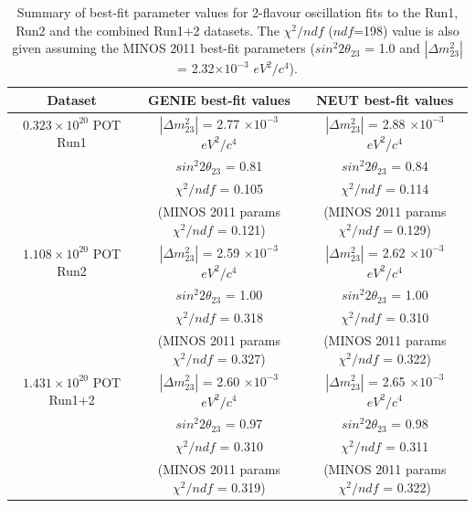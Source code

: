 \begin{table}[htb]
\center
\renewcommand{\arraystretch}{1.75} %
\begin{tabular}{|c||c|c|}
\hline
Dataset                             &  GENIE best-fit values                                         &  NEUT best-fit values   \\
\hline
$0.323\times10^{20}$ POT Run1       &   $|\Delta m^{2}_{23}|$ = 2.77 $\times10^{-3}$ $eV^{2}/c^{4}$  &  $|\Delta m^{2}_{23}|$ = 2.88 $\times10^{-3}$ $eV^{2}/c^{4}$     \\
                                    &   $sin^{2}2\theta_{23}$ = 0.81                                 &  $sin^{2}2\theta_{23}$ = 0.84 \\
                                    &   $\chi^{2}/ndf$ = 0.105                                       &  $\chi^{2}/ndf$ = 0.114 \\
                                    &   (MINOS 2011 params $\chi^{2}/ndf$ = 0.121)                   &  (MINOS 2011 params $\chi^{2}/ndf$ = 0.129) \\
\hline
$1.108\times10^{20}$ POT Run2       &   $|\Delta m^{2}_{23}|$ = 2.59 $\times10^{-3}$ $eV^{2}/c^{4}$  &  $|\Delta m^{2}_{23}|$ = 2.62 $\times10^{-3}$ $eV^{2}/c^{4}$     \\
                                    &   $sin^{2}2\theta_{23}$ = 1.00                                 &  $sin^{2}2\theta_{23}$ = 1.00 \\
                                    &   $\chi^{2}/ndf$ = 0.318                                       &  $\chi^{2}/ndf$ = 0.310 \\
                                    &   (MINOS 2011 params $\chi^{2}/ndf$ = 0.327)                   &  (MINOS 2011 params $\chi^{2}/ndf$ = 0.322) \\
\hline
$1.431\times10^{20}$ POT Run1+2     &   $|\Delta m^{2}_{23}|$ = 2.60 $\times10^{-3}$ $eV^{2}/c^{4}$  &  $|\Delta m^{2}_{23}|$ = 2.65 $\times10^{-3}$ $eV^{2}/c^{4}$     \\
                                    &   $sin^{2}2\theta_{23}$ = 0.97                                 &  $sin^{2}2\theta_{23}$ = 0.98 \\
                                    &   $\chi^{2}/ndf$ = 0.310                                       &  $\chi^{2}/ndf$ = 0.311 \\
                                    &   (MINOS 2011 params $\chi^{2}/ndf$ = 0.319)                   &  (MINOS 2011 params $\chi^{2}/ndf$ = 0.322) \\
\hline
\end{tabular}\\[2pt]
\caption{
  Summary of best-fit parameter values for 2-flavour oscillation fits to the Run1, Run2 and the combined Run1+2 datasets.
  The $\chi^{2}/ndf$ ($ndf$=198) value is also given assuming the MINOS 2011 best-fit parameters
  ($sin^{2}2\theta_{23}$ = 1.0 and $|\Delta m^{2}_{23}|$ = 2.32$\times10^{-3}$ $eV^{2}/c^{4}$).
}
\label{table:bestfit_params_summary}
\end{table}
  


